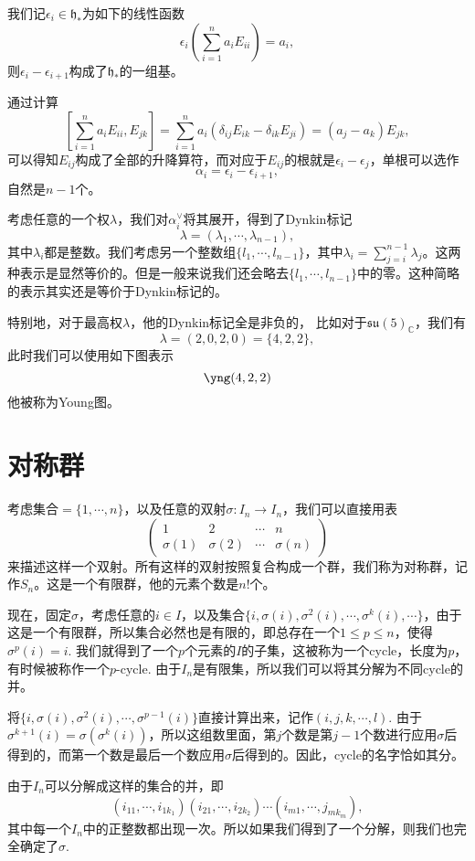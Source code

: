 \documentclass[9pt]{extarticle}
\newcommand{\cc}{\mathbb{C}}
\begin{document}
我们记$\epsilon_i \in \mathfrak{h}_*$为如下的线性函数
\[
	 \epsilon_i\left(\sum_{i=1}^n a_i E_{ii}\right)=a_i,
\]
则$\epsilon_i-\epsilon_{i+1}$构成了$\mathfrak{h}_*$的一组基。

通过计算
\[
	\left [\sum_{i=1}^n a_i E_{ii},E_{jk}\right ]=\sum_{i=1}^n  a_i(\delta_{ij}E_{ik}-\delta_{ik}E_{ji})=(a_j-a_k)E_{jk},
\]
可以得知$E_{ij}$构成了全部的升降算符，而对应于$E_{ij}$的根就是$\epsilon_i-\epsilon_j$，单根可以选作
\[
	\alpha_i = \epsilon_i-\epsilon_{i+1},
\]
自然是$n-1$个。

考虑任意的一个权$\lambda$，我们对$\alpha_i^\vee$将其展开，得到了Dynkin标记
\[
	\lambda=(\lambda_1,\cdots,\lambda_{n-1}),
\]
其中$\lambda_i$都是整数。我们考虑另一个整数组$\{l_1,\cdots,l_{n-1}\}$，其中$\lambda_i=\sum_{j=i}^{n-1}\lambda_j$。这两种表示是显然等价的。但是一般来说我们还会略去$\{l_1,\cdots,l_{n-1}\}$中的零。这种简略的表示其实还是等价于Dynkin标记的。

特别地，对于最高权$\lambda$，他的Dynkin标记全是非负的，
比如对于$\mathfrak{su}(5)_\cc$，我们有
\[
	\lambda=(2,0,2,0)=\{4,2,2\},
\]
此时我们可以使用如下图表示
\[
	\yng(4,2,2)
\]
他被称为Young图。

\section{对称群}

\para 考虑集合$=\{1,\cdots,n\}$，以及任意的双射$\sigma : I_n\to I_n$，我们可以直接用表
\[
	\begin{pmatrix}
	1&2&\cdots &n\\
	\sigma(1)&\sigma(2)&\cdots &\sigma(n)
	\end{pmatrix}
\]
来描述这样一个双射。所有这样的双射按照复合构成一个群，我们称为对称群，记作$S_n$。这是一个有限群，他的元素个数是$n!$个。

现在，固定$\sigma$，考虑任意的$i\in I$，以及集合$\{i,\sigma(i),\sigma^2(i),\cdots,\sigma^k(i),\cdots\}$，由于这是一个有限群，所以集合必然也是有限的，即总存在一个$1\leq p\leq n$，使得$\sigma^p(i)=i$. 我们就得到了一个$p$个元素的$I$的子集，这被称为一个cycle，长度为$p$，有时候被称作一个$p$-cycle. 由于$I_n$是有限集，所以我们可以将其分解为不同cycle的并。

将$\{i,\sigma(i),\sigma^2(i),\cdots,\sigma^{p-1}(i)\}$直接计算出来，记作$(i,j,k,\cdots,l)$. 由于$\sigma^{k+1}(i)=\sigma(\sigma^k(i))$，所以这组数里面，第$j$个数是第$j-1$个数进行应用$\sigma$后得到的，而第一个数是最后一个数应用$\sigma$后得到的。因此，cycle的名字恰如其分。

由于$I_n$可以分解成这样的集合的并，即
\[
	(i_{11},\cdots,i_{1k_1})(i_{21},\cdots,i_{2k_2})\cdots (i_{m1},\cdots,j_{mk_m}),
\]
其中每一个$I_n$中的正整数都出现一次。所以如果我们得到了一个分解，则我们也完全确定了$\sigma$.
\end{document}
